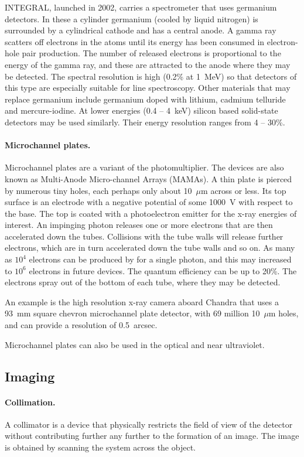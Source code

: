 INTEGRAL, launched in 2002, carries a spectrometer that uses germanium detectors. In these
a cylinder germanium (cooled by liquid nitrogen) is surrounded by a cylindrical cathode and has
a central anode. A gamma ray scatters off electrons in the atoms until its energy has been
consumed in electron-hole pair production. The number of released electrons is proportional
to the energy of the gamma ray, and these are attracted to the anode where they may be
detected. The spectral resolution is high (0.2\% at 1~MeV) so that detectors of this type
are especially suitable for line spectroscopy. Other materials that may replace germanium
include germanium doped with lithium, cadmium telluride and mercure-iodine. At lower energies
(0.4 -- 4~keV) silicon based  solid-state detectors may be used similarly. Their energy resolution
ranges from 4 -- 30\%.

\paragraph{Microchannel plates.} Microchannel plates are a variant of the photomultiplier. The devices 
are also known as Multi-Anode Micro-channel Arrays (MAMAs). A thin plate is pierced by numerous tiny holes, each perhaps only about 10~$\mu$m across or less. Its top surface is
an electrode with a negative potential of some 1000~V with respect to the base. The top is
coated with a photoelectron emitter for the x-ray energies of interest. An impinging photon
releases one or more electrons that are then accelerated down the tubes. Collisions with the tube
walls will release further electrons, which are in turn accelerated down the tube walls and so on.
As many as $10^4$ electrons can be produced by for a single photon, and this may increased
to $10^6$ electrons in future devices. The quantum efficiency can be up to 20\%. The electrons
spray out of the bottom of each tube, where they may be detected. 

An example is the high resolution x-ray camera aboard Chandra that uses a 93~mm square
chevron microchannel plate detector, with 69 million 10~$\mu$m holes, and can provide a
resolution of 0.5~arcsec. 

Microchannel plates can also be used in the optical and near ultraviolet.

\subsection{Imaging}

\paragraph{Collimation.} A collimator is a device that physically restricts the field of view of the detector
without contributing further any further to the formation of an image. The image is obtained by 
scanning the system across the object. 

